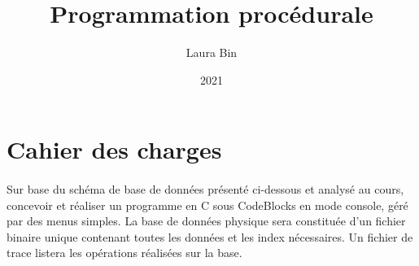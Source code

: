 \documentclass{article}
\title{Programmation procédurale}
\date{2021}
\author{Laura Bin}
\begin{document}
    \newpage
    \tableofcontents
    \newpage

    \section{Cahier des charges}
    \paragraph{}
    Sur base du schéma de base de données présenté ci-dessous et analysé au cours, concevoir et réaliser un programme en C sous CodeBlocks en mode console, géré par des menus simples. La base de données physique sera constituée d'un fichier binaire unique contenant toutes les données et les index nécessaires. Un fichier de trace listera les opérations réalisées sur la base.
\end{document}
